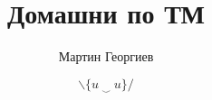 \documentclass[a4paper, fleqn]{article}
\title{Домашни по ТМ}
\author{Мартин Георгиев}
\date{$\backslash \{u\ _\smallsmile \  u\}/$}
\theoremstyle{cooltheorem}
\theoremstyle{remark}
\begin{document}
\maketitle








\bigbreak











\end{document}
